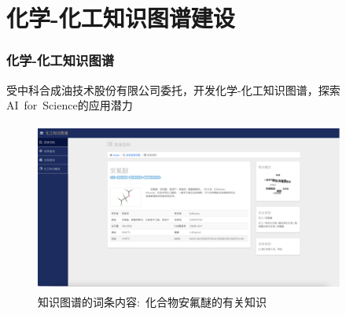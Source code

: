 \section{化学-化工知识图谱建设}
\begin{frame}
	\frametitle{化学-化工知识图谱}
	受中科合成油技术股份有限公司委托，开发化学-化工知识图谱，探索\textrm{AI~for~Science}的应用潜力
\begin{figure}[h!]
\centering
\includegraphics[height=2.20in,width=4.00in,viewport=0 0 240 130,clip]{Figures/KG_Chem-Enflurane.png}
\caption{\tiny 知识图谱的词条内容:~化合物\textrm{安氟醚}的有关知识}%
\label{Fig:KG_Chem-Enflurane}
\end{figure}
\end{frame}

